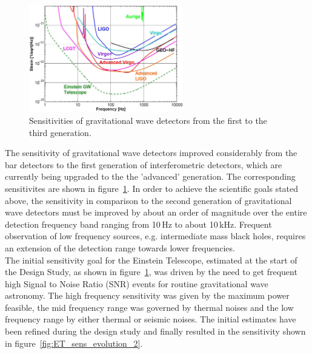 \begin{figure}
	\centering
		\includegraphics[width=0.6\textwidth]{Sec_Introduction/3gen_sens.png}
	\caption{Sensitivities of gravitational wave detectors from the first to the third generation.}
	\label{fig:GW_sens_evolution}
\end{figure}
The sensitivity of gravitational wave detectors improved considerably from the bar detectors to the first generation of interferometric detectors, which are currently being upgraded to the the 'advanced' generation. The corresponding sensitivites are shown in figure~\ref{fig:GW_sens_evolution}. 
In order to achieve the scientific goals stated above, the sensitivity in comparison to the second generation of gravitational wave detectors must be improved by about an order of magnitude over the entire detection frequency band ranging from 10\,Hz to about 10\,kHz. Frequent observation of low frequency sources, e.g. intermediate mass black holes, requires an extension of the detection range towards lower frequencies. \\
The initial sensitivity goal for the Einstein Telescope, estimated at the start of the Design Study, as shown in figure~\ref{fig:GW_sens_evolution}, was driven by the need to get frequent high Signal to Noise Ratio (SNR)  events for routine gravitational wave astronomy. The high frequency sensitivity was given by the maximum power feasible, the mid frequency range was governed by thermal noises and the low frequency range by either thermal or seismic noises. The initial estimates have been refined during the design study and finally resulted in the sensitivity shown in figure~\ref{fig:ET_sens_evolution_2}.\\
